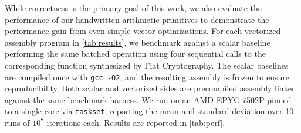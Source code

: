 While correctness is the primary goal of this work, we also evaluate the performance of our handwritten arithmetic primitives to demonstrate the performance gain from even simple vector optimizations.
For each vectorized assembly program in \autoref{tab:results}, we benchmark
against a scalar baseline performing the same batched operation using four
sequential calls to the corresponding function synthesized by Fiat Cryptography.
The scalar baselines are compiled once with \texttt{gcc -O2}, and the resulting assembly is frozen to ensure reproducibility. 
Both scalar and vectorized sides are precompiled assembly linked against the same benchmark harness. 
We run on an AMD EPYC 7502P pinned to a single core via \texttt{taskset}, reporting the mean and standard deviation over 10 runs of $10^7$ iterations each.
Results are reported in \autoref{tab:perf}.


